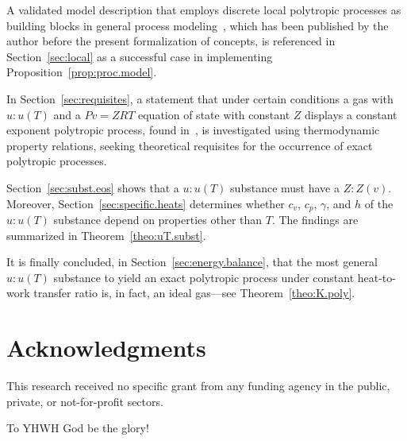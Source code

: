 \documentclass[fleqn,11pt]{SelfArx}
\begin{document}
    A validated model description that employs discrete local polytropic processes  as  building
    blocks in general process modeling~\cite{2017-NaaktgeborenC-IntJMechEngEduc}, which has been
    published by the author before the present  formalization  of  concepts,  is  referenced  in
    Section~\ref{sec:local}      as      a      successful      case       in       implementing
    Proposition~\ref{prop:proc.model}.

    In Section~\ref{sec:requisites}, a statement  that  under  certain  conditions  a  gas  with
    $u\!:\!u(T)$ and a $Pv = ZRT$ equation of  state  with  constant  $Z$  displays  a  constant
    exponent   polytropic   process,   found   in~\cite{2012-ChristiansJ-IntJMechEngEduc},    is
    investigated using thermodynamic property relations, seeking theoretical requisites for  the
    occurrence of exact polytropic processes.

    Section~\ref{sec:subst.eos} shows that a $u\!:\!u(T)$ substance must  have  a  $Z\!:\!Z(v)$.
    Moreover, Section~\ref{sec:specific.heats} determines whether $c_v$,  $c_p$,  $\gamma$,  and
    $h$ of the $u\!:\!u(T)$ substance depend on properties other  than  $T$.  The  findings  are
    summarized in Theorem~\ref{theo:uT.subst}.

    It  is  finally  concluded,  in  Section~\ref{sec:energy.balance},  that  the  most  general
    $u\!:\!u(T)$ substance to yield an exact  polytropic  process  under  constant  heat-to-work
    transfer ratio is, in fact, an ideal gas---see Theorem~\ref{theo:K.poly}.

\section*{Acknowledgments}

    This research received no specific grant from any funding agency in the public, private,  or
    not-for-profit sectors.

    To YHWH God be the glory!





\end{document}
